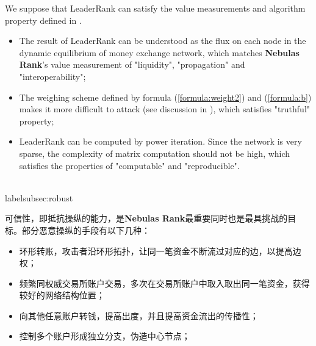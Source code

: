 We suppose that LeaderRank can satisfy the value measurements and algorithm property defined in .
\begin{itemize}
	\item The result of LeaderRank can be understood as the flux on each node in the dynamic equilibrium of money exchange network, which matches \textbf{Nebulas Rank}'s value measurement of "liquidity", "propagation" and "interoperability";
	\item The weighing scheme defined by formula (\ref{formula:weight2}) and (\ref{formula:b}) makes it more difficult to attack (see discussion in ), which satisfies "truthful" property;
	\item LeaderRank can be computed by power iteration. Since the network is very sparse, the complexity of matrix computation should not be high, which satisfies the properties of "computable" and "reproducible".
\end{itemize}


\\label{subsec:robust}

可信性，即抵抗操纵的能力，是\textbf{Nebulas Rank}最重要同时也是最具挑战的目标。部分恶意操纵的手段有以下几种：
\begin{itemize}
	\item 环形转账，攻击者沿环形拓扑，让同一笔资金不断流过对应的边，以提高边权；
	\item 频繁同权威交易所账户交易，多次在交易所账户中取入取出同一笔资金，获得较好的网络结构位置；
	\item 向其他任意账户转钱，提高出度，并且提高资金流出的传播性；
	\item 控制多个账户形成独立分支，伪造中心节点；
\end{itemize}

